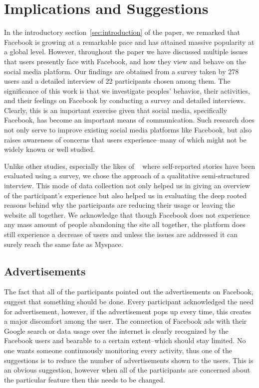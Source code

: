 \section{Implications and Suggestions}
\label{sec:implications}
In the introductory section~\ref{sec:introduction} of the paper, we remarked that Facebook is growing at a remarkable pace and has attained massive popularity at a global level. However, throughout the paper we have discussed multiple issues that users presently face with Facebook, and how they view and behave on the social media platform. Our findings are obtained from a survey taken by 278 users and a detailed interview of 22 participants chosen among them. The significance of this work is that we investigate peoples' behavior, their activities, and their feelings on Facebook by conducting a survey and detailed interviews. Clearly, this is an important exercise given that social media, specifically Facebook, has become an important means of communication. Such research does not only serve to improve existing social media platforms like Facebook, but also raises awareness of concerns that users experience--many of which might not be widely known or well studied. 

Unlike other studies, especially the likes of ~\cite{baumer2013limiting} where self-reported stories have been evaluated using a survey, we chose the approach of a qualitative semi-structured interview. This mode of data collection not only helped us in giving an overview of the participant's experience but also helped us in evaluating the deep rooted reasons behind why the participants are reducing their usage or leaving the website all together. We acknowledge that though Facebook does not experience any mass amount of people abandoning the site all together, the platform does still experience a decrease of users and unless the issues are addressed it can surely reach the same fate as Myspace.

\subsection{Advertisements}
The fact that all of the participants pointed out the advertisements on Facebook, suggest that something should be done. Every participant acknowledged the need for advertisement, however, if the advertisement pops up every time, this creates a major discomfort among the user. The connection of Facebook ads with their Google search or data usage over the internet is clearly recognized by the Facebook users and bearable to a certain extent--which should stay limited. No one wants someone continuously monitoring every activity, thus one of the suggestions is to reduce the number of advertisements shown to the users. This is an obvious suggestion, however when all of the participants are concerned about the particular feature then this needs to be changed.

